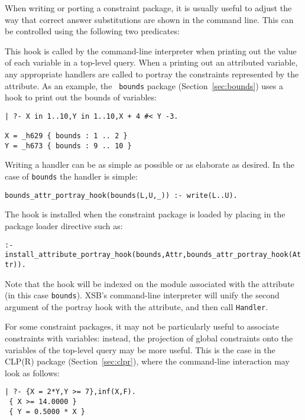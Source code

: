 When writing or porting a constraint package, it is usually useful to
adjust the way that correct answer substitutions are shown in the
command line.  This can be controlled using the following two predicates:

\begin{description}

%
This hook is called by the command-line interpreter when printing out
the value of each variable in a top-level query.  When a printing out
an attributed variable, any appropriate handlers are called to portray
the constraints represented by the attribute.  As an example, the {\tt
  bounds} package (Section~\ref{sec:bounds}) uses a hook to print out
the bounds of variables:
%
\begin{small}
\begin{verbatim}
| ?- X in 1..10,Y in 1..10,X + 4 #< Y -3.

X = _h629 { bounds : 1 .. 2 }
Y = _h673 { bounds : 9 .. 10 }
\end{verbatim}
\end{small}
%
Writing a handler can be as simple as possible or as elaborate as
desired.  In the case of {\tt bounds} the handler is simple:

{\small
{\tt bounds\_attr\_portray\_hook(bounds(L,U,\_)) :- write(L..U).}
}

The hook is installed when the constraint package is loaded by placing
in the package loader directive such as:

{\small
{\tt  :- install\_attribute\_portray\_hook(bounds,Attr,bounds\_attr\_portray\_hook(Attr)).}
}

Note that the hook will be indexed on the module associated with the
attribute (in this case {\tt bounds}).  XSB's command-line interpreter
will unify the second argument of the portray hook with the attribute,
and then call {\tt Handler}.

%
For some constraint packages, it may not be particularly useful to
associate constraints with variables: instead, the projection of
global constraints onto the variables of the top-level query may be
more useful.  This is the case in the CLP(R) package
(Section~\ref{sec:clpr}), where the command-line interaction may look as follows:
%
{\small
\begin{verbatim}
| ?- {X = 2*Y,Y >= 7},inf(X,F).
 { X >= 14.0000 }
 { Y = 0.5000 * X }


\end{verbatim}}
\end{description}
